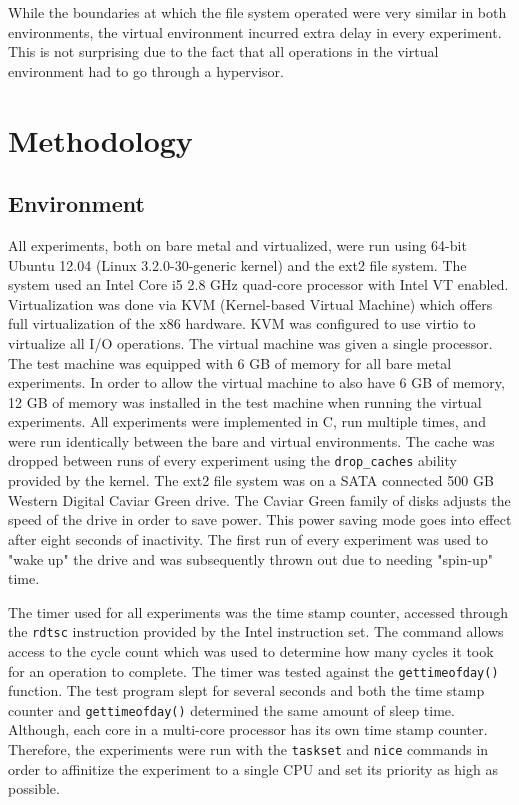 \documentclass[letterpaper,twocolumn,10pt]{article}
\begin{document}
While the boundaries at which the file system operated were very similar in both environments, the virtual environment incurred extra delay in every experiment.
This is not surprising due to the fact that all operations in the virtual environment had to go through a hypervisor.

\section{Methodology}
\subsection{Environment}
All experiments, both on bare metal and virtualized, were run using 64-bit Ubuntu 12.04 (Linux 3.2.0-30-generic kernel) and the ext2 file system.
The system used an Intel Core i5 2.8 GHz quad-core processor with Intel VT enabled.
Virtualization was done via KVM (Kernel-based Virtual Machine) which offers full virtualization of the x86 hardware.
KVM was configured to use virtio to virtualize all I/O operations.
The virtual machine was given a single processor.
The test machine was equipped with 6 GB of memory for all bare metal experiments.
In order to allow the virtual machine to also have 6 GB of memory, 12 GB of memory was installed in the test machine when running the virtual experiments.
All experiments were implemented in C, run multiple times, and were run identically between the bare and virtual environments.
The cache was dropped between runs of every experiment using the \texttt{drop\_caches} ability provided by the kernel.
The ext2 file system was on a SATA connected 500 GB Western Digital Caviar Green drive. 
The Caviar Green family of disks adjusts the speed of the drive in order to save power. 
This power saving mode goes into effect after eight seconds of inactivity.
The first run of every experiment was used to "wake up" the drive and was subsequently thrown out due to needing "spin-up" time. 

The timer used for all experiments was the time stamp counter, accessed through the \texttt{rdtsc} instruction provided by the Intel instruction set. 
The command allows access to the cycle count which was used to determine how many cycles it took for an operation to complete. 
The timer was tested against the \texttt{gettimeofday()} function. 
The test program slept for several seconds and both the time stamp counter and \texttt{gettimeofday()} determined the same amount of sleep time. 
Although, each core in a multi-core processor has its own time stamp counter.
Therefore, the experiments were run with the \texttt{taskset} and \texttt{nice} commands in order to affinitize the experiment to a single CPU and set its priority as high as possible.
\end{document}
